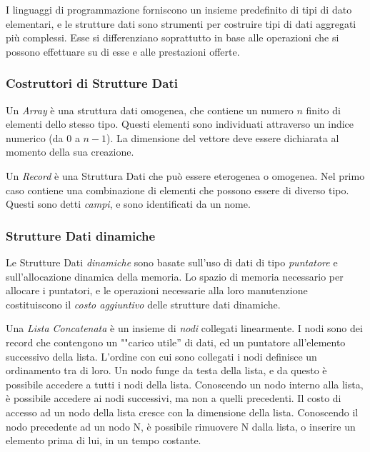 I linguaggi di programmazione forniscono un insieme predefinito di tipi di dato elementari, e le strutture dati sono strumenti per costruire tipi di dati aggregati più complessi. Esse si differenziano soprattutto in base alle operazioni che si possono effettuare su di esse e alle prestazioni offerte.

		\subsubsection{Costruttori di Strutture Dati}
	
Un  \emph{Array} è una struttura dati omogenea, che contiene un numero $n$ finito di elementi dello stesso tipo. Questi elementi sono individuati attraverso un indice numerico (da $0$ a $n-1$). La dimensione del vettore deve essere dichiarata al momento della sua creazione.

Un   \emph{Record} è una Struttura Dati che può essere eterogenea o omogenea. Nel primo caso contiene una combinazione di elementi che possono essere di diverso tipo. Questi sono detti \emph{campi}, e sono identificati da un nome.

		\subsubsection{Strutture Dati dinamiche}
Le Strutture Dati \emph{dinamiche} sono basate sull'uso di dati di tipo \emph{puntatore} e sull'allocazione dinamica della memoria. Lo spazio di memoria necessario per allocare i puntatori, e le operazioni necessarie alla loro manutenzione costituiscono il \emph{costo aggiuntivo} delle strutture dati dinamiche.

Una   \emph{Lista Concatenata} è un insieme di \emph{nodi} collegati linearmente. I nodi sono dei record che contengono un ""carico utile'' di dati, ed un puntatore all'elemento successivo della lista. L'ordine con cui sono collegati i nodi definisce un ordinamento tra di loro. Un nodo funge da testa della lista, e da questo è possibile accedere a tutti i nodi della lista. Conoscendo un nodo interno alla lista, è possibile accedere ai nodi successivi, ma non a quelli precedenti. Il costo di accesso ad un nodo della lista cresce con la dimensione della lista. Conoscendo il nodo precedente ad un nodo N, è possibile rimuovere N dalla lista, o inserire un elemento prima di lui, in un tempo costante.
	
